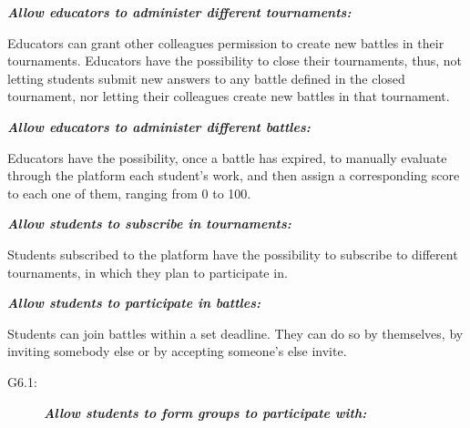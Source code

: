 \documentclass{article}
\begin{document}
\begin{description}
\begin{description}
                    \end{description}
                \item[G3:] \textit{\textbf{Allow educators to administer different tournaments:}}
                    \begin{description}
                        \item Educators can grant other colleagues permission to create new battles in their tournaments. Educators have the possibility to close their tournaments, thus, not letting students submit new answers to any battle defined in the closed tournament, nor letting their colleagues create new battles in that tournament. 
                    \end{description}
                \item[G4:] \textit{\textbf{Allow educators to administer different battles:}}
                    \begin{description}
                        \item Educators have the possibility, once a battle has expired, to manually evaluate through the platform each student's work, and then assign a corresponding score to each one of them, ranging from 0 to 100. 
                    \end{description}
                \item[G5:] \textbf{\textit{Allow students to subscribe in tournaments:}}
                    \begin{description}
                        \item Students subscribed to the platform have the possibility to subscribe to different tournaments, in which they plan to participate in.
                    \end{description}
                \item[G6:] \textbf{\textit{Allow students to participate in battles:}}
                    \begin{description}
                        \item Students can join battles within a set deadline. They can do so by themselves, by inviting somebody else or by accepting someone's else invite.
                        \begin{description}
                            \item[G6.1:] \textbf{\textit{Allow students to form groups to participate with:}}

\end{description}
\end{description}
\end{description}
\end{document}
